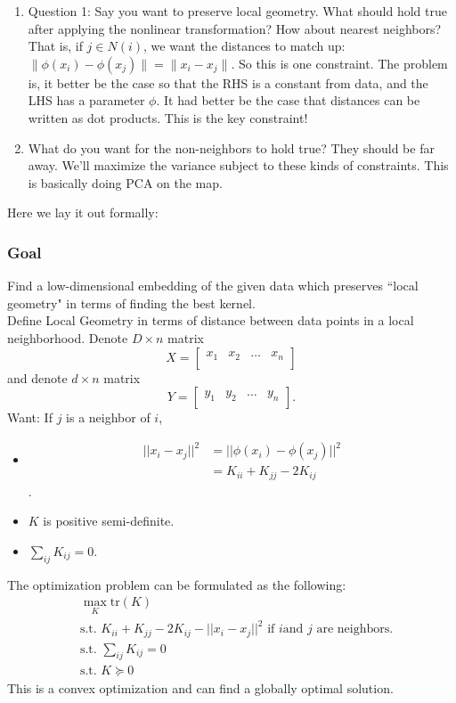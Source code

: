 \begin{enumerate}

\item Question 1: Say you want to preserve local geometry. What should hold true after applying the nonlinear transformation? How about nearest neighbors? That is, if $j \in N(i)$, we want the distances to match up: $\|\phi(x_i) - \phi(x_j)\| = \|x_i - x_j\|$. So this is one constraint. The problem is, it better be the case so that the RHS is a constant from data, and the LHS has a parameter $\phi$. It had better be the case that distances can be written as dot products. This is the key constraint!

\item What do you want for the non-neighbors to hold true? They should be far away. We'll maximize the variance subject to these kinds of constraints. This is basically doing PCA on the map. 

\end{enumerate}

Here we lay it out formally: 

\subsubsection*{Goal} Find a low-dimensional embedding of the given
data which preserves ``local geometry" in terms of finding the best
kernel.\\
Define Local Geometry in terms of distance between data points in a
local neighborhood. Denote $D\times n$ matrix
\[
X=
\begin{bmatrix}
    x_1 & x_2 & \dots & x_n \\
\end{bmatrix}
\]
and denote $d\times n$ matrix
\[
Y=
\begin{bmatrix}
    y_1 & y_2 & \dots & y_n \\
\end{bmatrix}.
\]
Want: If $j$ is a neighbor of $i$,
\begin{itemize}
\item \begin{align*}
||x_i - x_j||^2
&=||\phi (x_i)-\phi (x_j)||^2\\
&=K_{ii}+K_{jj}-2K_{ij}
\end{align*}.
\item $K$ is positive semi-definite.
\item $\sum_{ij} K_{ij}=0$.
\end{itemize}

The optimization problem can be formulated as the following:
\begin{align*}
&\max_{K} \text{tr}(K)\\
&\text{s.t. } K_{ii}+K_{jj}-2K_{ij}-||x_i-x_j||^2 \text{ if }i \text{
    and } j \text{ are neighbors}.\\ 
&\text{s.t. } \sum_{ij}K_{ij}=0\\
&\text{s.t. } K \succeq 0
\end{align*}
This is a convex optimization and can find a globally optimal solution.

